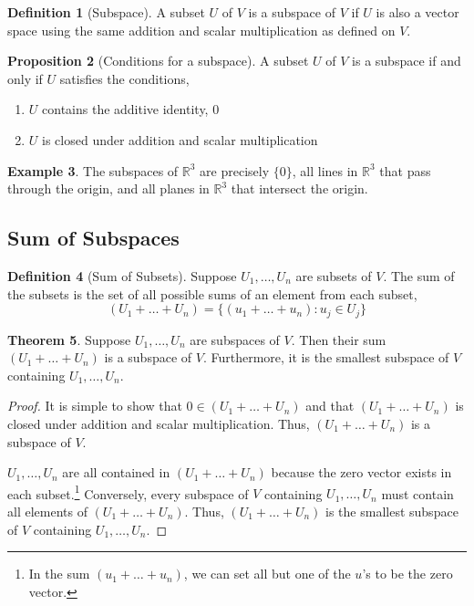 \documentclass[12pt]{report}
\numberwithin{equation}{section}
\theoremstyle{definition}
\newtheorem{theorem}{Theorem}[section]
\newtheorem{definition}[theorem]{Definition}
\newtheorem{proposition}[theorem]{Proposition}
\newtheorem{example}[theorem]{Example}
\begin{document}
\begin{definition}[Subspace]
	A subset $ U $ of $ V $ is a subspace of $ V $ if $ U $ is also a vector space using the same addition and scalar multiplication as defined on $ V $.
\end{definition}

\begin{proposition}[Conditions for a subspace]
	A subset $ U $ of $ V $ is a subspace if and only if $ U $ satisfies the conditions,
	\begin{enumerate}
		\item $ U $ contains the additive identity, $ 0 $
		\item $ U $ is closed under addition and scalar multiplication
	\end{enumerate}
\label{prop:subspace}
\end{proposition}

\begin{example}
	The subspaces of $ \mathbb{R}^3 $ are precisely $ \{0\} $, all lines in $ \mathbb{R}^3 $ that pass through the origin, and all planes in $ \mathbb{R}^3 $ that intersect the origin.
\end{example}

\subsection{Sum of Subspaces}

\begin{definition}[Sum of Subsets]
	Suppose $ U_1, \dots, U_n $ are subsets of $ V $. The sum of the subsets is the set of all possible sums of an element from each subset,
	\begin{equation}
			(U_1 + \dots + U_n) = \{ (u_1 + \dots + u_n) : u_j\in U_j \}
	\end{equation}
\end{definition}

\begin{theorem}
	Suppose $ U_1, \dots, U_n $ are subspaces of $ V $. Then their sum $ (U_1 + \dots + U_n )$ is a subspace of $ V $. Furthermore, it is the smallest subspace of $ V $ containing $ U_1, \dots, U_n $.
	
	\begin{proof}
		It is simple to show that $ 0 \in (U_1 + \dots + U_n )$ and that $ (U_1 + \dots + U_n)  $ is closed under addition and scalar multiplication. Thus, $ (U_1 + \dots + U_n ) $ is a subspace of $ V $.
		
		$ U_1, \dots, U_n $ are all contained in $ (U_1 + \dots + U_n)$ because the zero vector exists in each subset.\footnote{In the sum $ (u_1+\dots + u_n) $, we can set all but one of the $ u $'s to be the zero vector.} Conversely, every subspace of $ V $ containing $ U_1 ,\dots, U_n $ must contain all elements of $ (U_1 + \dots + U_n)$. Thus, $ (U_1 + \dots + U_n)$ is the smallest subspace of $ V $ containing $ U_1, \dots , U_n $.
	\end{proof}
\end{theorem}
\end{document}
